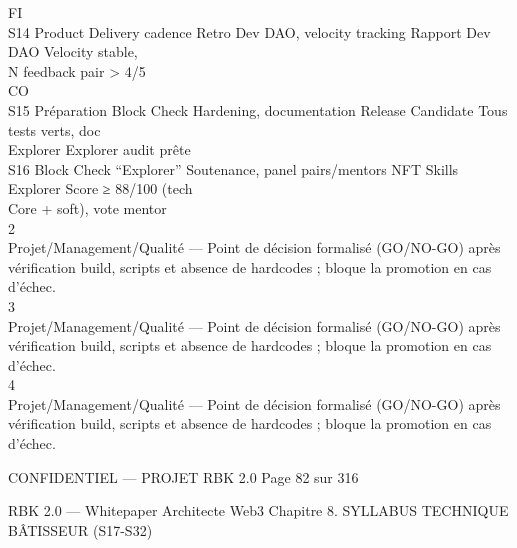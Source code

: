 \documentclass[12pt,landscape,a4paper]{article}
\newenvironment{confidential}
{\begin{tcolorbox}[
    colback=rbkred!5!white,
    colframe=rbkred!75!black,
    title=CONFIDENTIEL,
    fonttitle=\bfseries\color{white},
    coltitle=rbkred!75!black,
    breakable,
    enhanced,
    frame hidden,
    borderline west={2pt}{0pt}{rbkred!75!black}
]}
{\end{tcolorbox}}
\begin{document}
\vspace{0.5em}
\vspace{0.5em}
\vspace{0.5em}
FI\\
S14     Product Delivery cadence             Retro Dev DAO, velocity tracking   Rapport Dev DAO          Velocity stable,\\
\vspace{0.5em}
N                                                          feedback pair \textgreater{} 4/5\\
CO\\
S15     Préparation Block Check              Hardening, documentation           Release Candidate        Tous tests verts, doc\\
Explorer                                                                Explorer                 audit prête\\
S16     Block Check “Explorer”               Soutenance, panel pairs/mentors    NFT Skills Explorer      Score ≥ 88/100 (tech\\
Core                     + soft), vote mentor\\
\vspace{0.5em}
\vspace{0.5em}
\vspace{0.5em}
\vspace{0.5em}
2\\
Projet/Management/Qualité — Point de décision formalisé (GO/NO-GO) après vérification build, scripts et absence de hardcodes ; bloque la promotion en cas d’échec.\\
3\\
Projet/Management/Qualité — Point de décision formalisé (GO/NO-GO) après vérification build, scripts et absence de hardcodes ; bloque la promotion en cas d’échec.\\
4\\
Projet/Management/Qualité — Point de décision formalisé (GO/NO-GO) après vérification build, scripts et absence de hardcodes ; bloque la promotion en cas d’échec.\\
\vspace{0.5em}
\vspace{0.5em}
\begin{confidential}CONFIDENTIEL — PROJET RBK 2.0                                          Page 82 sur 316\end{confidential}
RBK 2.0 — Whitepaper Architecte Web3                                                                     Chapitre 8. SYLLABUS TECHNIQUE\\
\vspace{0.5em}
\vspace{0.5em}
\vspace{0.5em}
BÂTISSEUR (S17-S32)\\
\vspace{0.5em}
\end{document}
